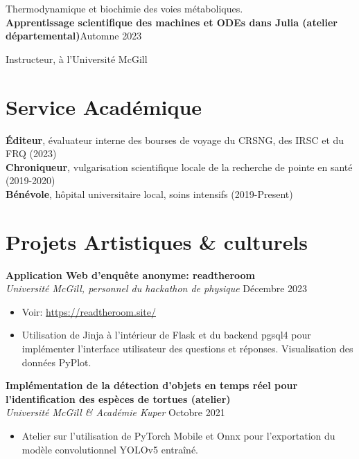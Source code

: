 \documentclass{article}
\newcommand{\cvsection}[1]{\section*{\rmfamily#1}}
\begin{document}
\hspace{2em} Thermodynamique et biochimie des voies métaboliques.\\

\textbf{Apprentissage scientifique des machines et ODEs dans Julia (atelier départemental)}\hfill Automne 2023

\hspace{2em}Instructeur, à l'Université McGill

\cvsection{Service Académique}
\indent

\textbf{Éditeur}, évaluateur interne des bourses de voyage du CRSNG, des IRSC et du FRQ \hfill (2023)\\
\indent
\textbf{Chroniqueur}, vulgarisation scientifique locale de la recherche de pointe en santé \hfill (2019-2020)\\
\indent
\textbf{Bénévole}, hôpital universitaire local, soins intensifs \hfill (2019-Present)
\cvsection{Projets Artistiques \& culturels}
\indent

\textbf{Application Web d'enquête anonyme: readtheroom}\\
\indent
\textit{Université McGill, personnel du hackathon de physique} \hfill Décembre 2023
\begin{itemize}[itemsep=0pt]
    \item[] Voir: \url{https://readtheroom.site/}
    \item[] Utilisation de Jinja à l'intérieur de Flask et du backend pgsql4 pour implémenter l'interface utilisateur des questions et réponses. Visualisation des données PyPlot.
\end{itemize}

\textbf{Implémentation de la détection d'objets en temps réel pour l'identification des espèces de tortues (atelier)}\\
\indent
\textit{Université McGill \& Académie Kuper} \hfill Octobre 2021
\begin{itemize}[itemsep=0pt]
    \item[] Atelier sur l'utilisation de PyTorch Mobile et Onnx pour l'exportation du modèle convolutionnel YOLOv5 entraîné.
\end{itemize}







\end{document}
